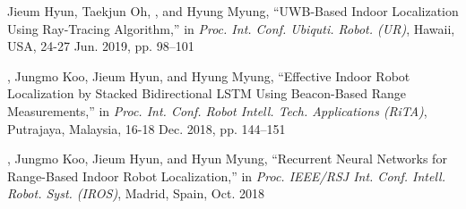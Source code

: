 \begin{pubSubsectionNum}
    \item Jieum Hyun, Taekjun Oh, \hyungtaelim, and Hyung Myung, ``UWB-Based Indoor Localization Using Ray-Tracing Algorithm,'' in \textit{Proc. Int. Conf. Ubiquti. Robot. (UR)}, Hawaii, USA, 24-27 Jun. 2019, pp. 98--101
    \item \hyungtaelim, Jungmo Koo, Jieum Hyun, and Hyung Myung, ``Effective Indoor Robot Localization by Stacked Bidirectional LSTM Using Beacon-Based Range Measurements,'' in \textit{Proc. Int. Conf. Robot Intell. Tech. Applications (RiTA)}, Putrajaya, Malaysia, 16-18 Dec. 2018, pp. 144--151
    \item \hyungtaelim, Jungmo Koo, Jieum Hyun, and Hyun Myung, ``Recurrent Neural Networks for Range-Based Indoor Robot Localization,'' in \textit{Proc. IEEE/RSJ Int. Conf. Intell. Robot. Syst. (IROS)}, Madrid, Spain, Oct. 2018
\end{pubSubsectionNum}

%
%
